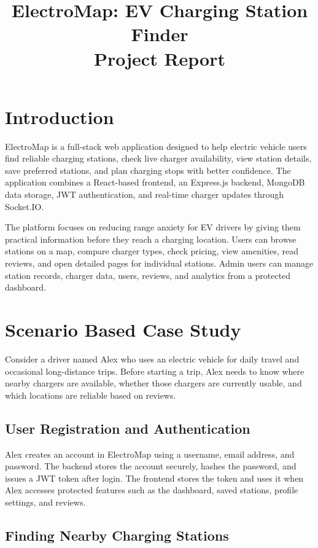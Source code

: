 \documentclass[12pt,a4paper]{article}
\title{\textbf{ElectroMap: EV Charging Station Finder}\\Project Report}
\author{}
\date{}
\begin{document}
\maketitle
\tableofcontents
\newpage

\section{Introduction}

ElectroMap is a full-stack web application designed to help electric vehicle users find reliable charging stations, check live charger availability, view station details, save preferred stations, and plan charging stops with better confidence. The application combines a React-based frontend, an Express.js backend, MongoDB data storage, JWT authentication, and real-time charger updates through Socket.IO.

The platform focuses on reducing range anxiety for EV drivers by giving them practical information before they reach a charging location. Users can browse stations on a map, compare charger types, check pricing, view amenities, read reviews, and open detailed pages for individual stations. Admin users can manage station records, charger data, users, reviews, and analytics from a protected dashboard.

\section{Scenario Based Case Study}

Consider a driver named Alex who uses an electric vehicle for daily travel and occasional long-distance trips. Before starting a trip, Alex needs to know where nearby chargers are available, whether those chargers are currently usable, and which locations are reliable based on reviews.

\subsection{User Registration and Authentication}

Alex creates an account in ElectroMap using a username, email address, and password. The backend stores the account securely, hashes the password, and issues a JWT token after login. The frontend stores the token and uses it when Alex accesses protected features such as the dashboard, saved stations, profile settings, and reviews.

\subsection{Finding Nearby Charging Stations}
\end{document}
